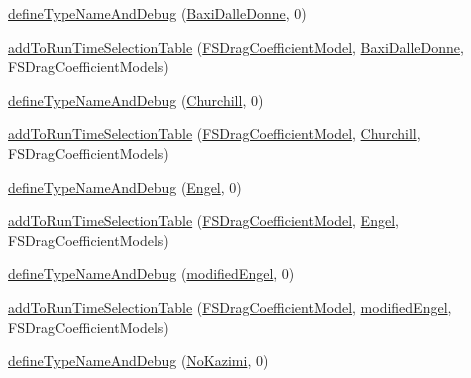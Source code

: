 \begin{DoxyCompactItemize}
\item 
\hyperlink{namespaceFoam_1_1FSDragCoefficientModels_a1cf0fe19ae60ba8722d62b6fafe77348}{define\+Type\+Name\+And\+Debug} (\hyperlink{classFoam_1_1FSDragCoefficientModels_1_1BaxiDalleDonne}{Baxi\+Dalle\+Donne}, 0)
\item 
\hyperlink{namespaceFoam_1_1FSDragCoefficientModels_a7eef58930b1f6e77feaf251d205207d0}{add\+To\+Run\+Time\+Selection\+Table} (\hyperlink{classFoam_1_1FSDragCoefficientModel}{F\+S\+Drag\+Coefficient\+Model}, \hyperlink{classFoam_1_1FSDragCoefficientModels_1_1BaxiDalleDonne}{Baxi\+Dalle\+Donne}, F\+S\+Drag\+Coefficient\+Models)
\item 
\hyperlink{namespaceFoam_1_1FSDragCoefficientModels_ae908dd05eee601b6b7b8a0ec86629365}{define\+Type\+Name\+And\+Debug} (\hyperlink{classFoam_1_1FSDragCoefficientModels_1_1Churchill}{Churchill}, 0)
\item 
\hyperlink{namespaceFoam_1_1FSDragCoefficientModels_a58d1f9b1eb31eb481f4ec480fa0393cd}{add\+To\+Run\+Time\+Selection\+Table} (\hyperlink{classFoam_1_1FSDragCoefficientModel}{F\+S\+Drag\+Coefficient\+Model}, \hyperlink{classFoam_1_1FSDragCoefficientModels_1_1Churchill}{Churchill}, F\+S\+Drag\+Coefficient\+Models)
\item 
\hyperlink{namespaceFoam_1_1FSDragCoefficientModels_af88a6a50d2fef676ef079ad884ab4779}{define\+Type\+Name\+And\+Debug} (\hyperlink{classFoam_1_1FSDragCoefficientModels_1_1Engel}{Engel}, 0)
\item 
\hyperlink{namespaceFoam_1_1FSDragCoefficientModels_a75b82baf5209f865f19aac020664141a}{add\+To\+Run\+Time\+Selection\+Table} (\hyperlink{classFoam_1_1FSDragCoefficientModel}{F\+S\+Drag\+Coefficient\+Model}, \hyperlink{classFoam_1_1FSDragCoefficientModels_1_1Engel}{Engel}, F\+S\+Drag\+Coefficient\+Models)
\item 
\hyperlink{namespaceFoam_1_1FSDragCoefficientModels_a96e53a3b63b0347cd002d0b890e9d9d2}{define\+Type\+Name\+And\+Debug} (\hyperlink{classFoam_1_1FSDragCoefficientModels_1_1modifiedEngel}{modified\+Engel}, 0)
\item 
\hyperlink{namespaceFoam_1_1FSDragCoefficientModels_ab2ca44a0850bb87af16c25dceabc45f0}{add\+To\+Run\+Time\+Selection\+Table} (\hyperlink{classFoam_1_1FSDragCoefficientModel}{F\+S\+Drag\+Coefficient\+Model}, \hyperlink{classFoam_1_1FSDragCoefficientModels_1_1modifiedEngel}{modified\+Engel}, F\+S\+Drag\+Coefficient\+Models)
\item 
\hyperlink{namespaceFoam_1_1FSDragCoefficientModels_a57c6612cb33e5c9aa4c4d48d1ea14100}{define\+Type\+Name\+And\+Debug} (\hyperlink{classFoam_1_1FSDragCoefficientModels_1_1NoKazimi}{No\+Kazimi}, 0)

\end{DoxyCompactItemize}
